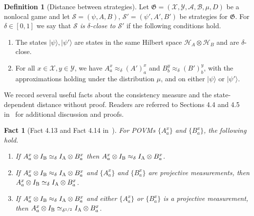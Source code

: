 \documentclass[11pt]{article}
\newtheorem{fact}[theorem]{Fact}
\theoremstyle{definition}
\newtheorem{definition}[theorem]{Definition}
\newcommand{\ket}[1]{|#1\rangle}
\newcommand{\mH}{\ensuremath{\mathcal{H}}}
\newcommand{\game}{\mathfrak{G}}
\newcommand{\strategy}{\mathscr{S}}
\newcommand{\labelstyle}[1]{\ensuremath{\textsc{#1}}\xspace}
\newcommand{\alice}{\labelstyle{A}}
\newcommand{\bob}{\labelstyle{B}}
\renewcommand{\cal}[1]{\mathcal{#1}}
\begin{document}
\begin{definition}[Distance between strategies]
  \label{def:strategy-distance}
  Let $\game = (\cal{X}, \cal{Y}, \cal{A}, \cal{B}, \mu, D)$ be a nonlocal game
  and let $\strategy = (\psi, A, B)$, $\strategy' = (\psi', A', B')$ be 
  strategies for $\game$.
  For $\delta\in[0,1]$ we say that \emph{$\strategy$ is $\delta$-close to
    $\strategy'$} if the following conditions hold.
  \begin{enumerate}
	\item The states $\ket{\psi}, \ket{\psi'}$ are states in the same
    Hilbert space $\mH_A \otimes \mH_B$ and are $\delta$-close.
	\item For all $x \in \cal{X}, y \in \cal{Y}$, we have $A^x_a \approx_\delta
    (A')^x_a$ and $B^y_b \approx_\delta (B')^y_b$, with the approximations
    holding under the distribution $\mu$, and on either $\ket{\psi}$ or
    $\ket{\psi'}$.
  \end{enumerate}
\end{definition}

We record several useful facts about the consistency measure and the
state-dependent distance without proof.
Readers are referred to Sections 4.4 and 4.5 in~\cite{NW19} for additional
discussion and proofs.

\begin{fact}[Fact 4.13 and Fact 4.14 in~\cite{NW19}]
  \label{fact:agreement}
  For POVMs $\{A^x_a\}$ and $\{B^x_a\}$, the following hold.
  \begin{enumerate}
  \item If $A^x_a \otimes I_\bob \simeq_\delta I_\alice \otimes B^x_a$ then
    $A^x_a \otimes I_\bob \approx_\delta I_\alice \otimes B^x_a$.
    \label{item:consistency-implies-approx}
  \item If $A^x_a \otimes I_\bob \approx_\delta I_\alice \otimes B^x_a$
    \emph{and} $\{A^x_a\}$ and $\{B^x_a\}$ are projective measurements, then
    $A^x_a \otimes I_\bob \simeq_\delta I_\alice \otimes B^x_a$.
    \label{item:both-projectors-implies-consistency}
  \item If $A^x_a \otimes I_\bob \approx_\delta I_\alice \otimes B^x_a$ and
    either $\{A^x_a\}$ or $\{B^x_a\}$ is a projective measurement, then
    $A^x_a \otimes I_\bob \simeq_{\delta^{1/2}} I_\alice \otimes B^x_a$.
    \label{item:one-projector-implies-consistency}
  \end{enumerate}
\end{fact}
\end{document}

